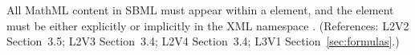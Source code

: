 All MathML content in SBML must appear within a 
element, and the  element must be either explicitly or
implicitly in the XML namespace
.  (References: L2V2
Section~3.5; L2V3 Section~3.4; L2V4 Section~3.4; L3V1 Section~\ref{sec:formulas}.)

